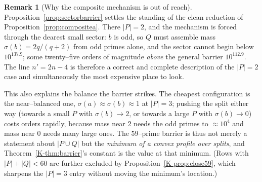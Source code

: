 \documentclass[11pt]{article}
\theoremstyle{definition}
\newtheorem{remark}[theorem]{Remark}
\begin{document}
\begin{remark}[Why the composite mechanism is out of reach]\label{rem:sectorcost}
Proposition~\ref{prop:sectorbarrier} settles the standing of the clean reduction of
Proposition~\ref{prop:compositea}. There $|P|=2$, and the mechanism is forced through the dearest
small sector: $b$ is odd, so $Q$ must assemble mass $\sigma(b)=2q/(q+2)$ from odd primes alone, and
the sector cannot begin below $10^{137.9}$; some twenty--five orders of magnitude \emph{above} the
general barrier $10^{112.9}$. The line $n'=2n-4$ is therefore a correct and complete description of
the $|P|=2$ case and simultaneously the most expensive place to look.

This also explains the balance the barrier strikes. The cheapest configuration is the near--balanced
one, $\sigma(a)\approx\sigma(b)\approx1$ at $|P|=3$; pushing the split either way (towards a small
$P$ with $\sigma(b)\to2$, or towards a large $P$ with $\sigma(b)\to0$) costs orders rapidly, because
mass near $2$ needs the odd primes to $\approx10^4$ and mass near $0$ needs many large ones. The
$59$--prime barrier is thus not merely a statement about $|P\cup Q|$ but the \emph{minimum of a
convex profile over splits}, and Theorem~\ref{K-thm:barrier}'s constant is the value at that minimum.
(Rows with $|P|+|Q|<60$ are further excluded by Proposition~\ref{K-prop:close59}, which sharpens the
$|P|=3$ entry without moving the minimum's location.)
\end{remark}
\end{document}
